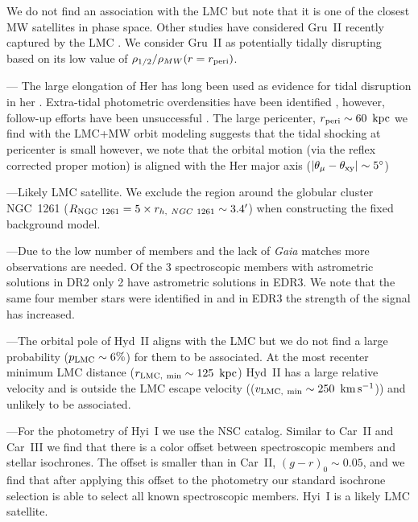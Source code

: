 \documentclass[twocolumn]{aastex63}
\newcommand{\degree}{\ensuremath{{}^{\circ}}\xspace}
\begin{document}
We do not find an association with the LMC but note that it is one of the closest MW satellites in phase space.  Other studies have considered Gru~II recently captured by the LMC \citep[e.g.,][]{Battaglia2022A&A...657A..54B}. 
We consider Gru~II as potentially tidally disrupting based on its low value of $\rho_{1/2}/\rho_{MW}(r=r_{\rm peri})$. 

---
The  large elongation of Her has long been used as evidence for tidal disruption in her \citep[e.g., ][]{Martin2010ApJ...721.1333M, Kupper2017ApJ...834..112K, Fu2019ApJ...883...11F}. 
Extra-tidal photometric overdensities have been identified \citep{Sand2009ApJ...704..898S, Roderick2015ApJ...804..134R}, however, follow-up efforts have been unsuccessful \citep{Fu2019ApJ...883...11F, MutluPakdil2020ApJ...902..106M}. 
The large pericenter, $r_{\rm peri}\sim60~\mathrm{\,kpc}$ we find with the LMC+MW orbit modeling suggests that the tidal shocking at pericenter is small however, we note that the orbital motion (via the reflex corrected proper motion) is aligned with the Her major axis ($| \theta_{\mu}-\theta_{\rm xy} |\sim5\degree$)  

---Likely LMC satellite.  {We exclude the region around the globular cluster NGC~1261 ($R_{\rm NGC~1261}=5\times r_{h,~NGC~1261}\sim 3.4\mbox{$^\prime$}$) when constructing the fixed background model.}

---Due to the low number of members and the lack of {\it Gaia} matches more observations are needed. Of the 3 spectroscopic members \citep{Fritz2019A&A...623A.129F} with astrometric solutions in DR2 only 2 have astrometric solutions in EDR3. We note that the same four member stars were identified in \citet{Pace2019ApJ...875...77P} and in EDR3 the strength of the signal has increased.

---The orbital pole of Hyd~II aligns with the LMC  \citep{Kallivayalil2018ApJ...867...19K} but we do not find a large probability ($p_{\rm LMC}\sim 6\%$) for them to be associated.  At the most recenter minimum LMC distance ($r_{\rm LMC,~min}\sim125~\mathrm{\,kpc}$) Hyd~II has a large relative velocity and is outside the LMC escape velocity (($v_{\rm LMC,~min}\sim250~\mathrm{\,km} \mathrm{\,s}^{-1}$)) and unlikely to be associated.

---For the photometry of Hyi~I we use the NSC catalog. Similar to Car~II and Car~III we find that there is a color offset between spectroscopic members and stellar isochrones. The offset is smaller than in Car~II, $(g-r)_0\sim0.05$, and we find that after applying this offset to the photometry our standard isochrone selection is able to select all known spectroscopic members.  Hyi~I is a likely LMC satellite.
\end{document}
